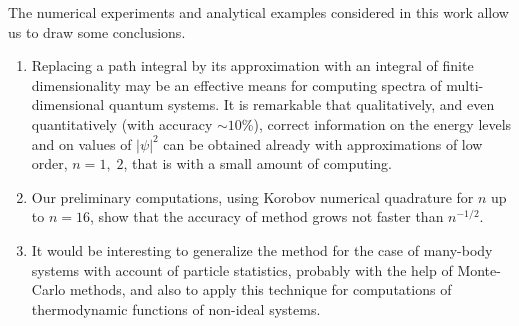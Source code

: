 \documentclass[11pt]{article}
\begin{document}
The numerical experiments and analytical examples considered in this work allow us to draw some conclusions.

\begin{enumerate}
\item  Replacing a path integral by its approximation with an integral of 
finite dimensionality may be an effective means for computing spectra
of multi-dimensional quantum systems. 
It is remarkable that qualitatively, and even quantitatively 
(with accuracy 
$\sim 10$\%), correct information 
on the energy levels and on values of 
$|\psi|^2$  can be obtained already with approximations of low order, 
$n=1, \; 2$, that is with a small amount of computing.
\item Our preliminary computations, using Korobov numerical quadrature for 
$n$ up to $n=16$, show that the accuracy of method grows not faster than 
$n^{-1/2}$.
\item It would be interesting to generalize the method for the case of
many-body systems with account of particle statistics, probably with the help
of Monte-Carlo methods, and also to apply this technique for computations
of thermodynamic functions of non-ideal systems.
\end{enumerate}
\end{document}
